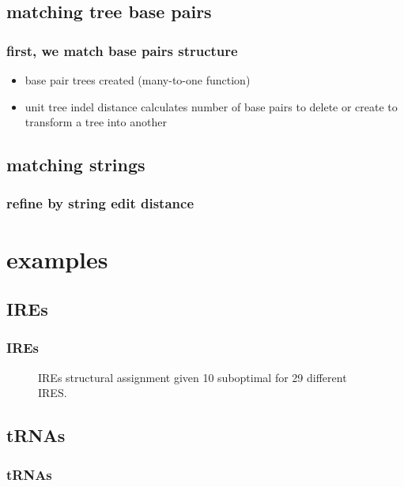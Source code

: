\documentclass{beamer}
\begin{document}
\subsection{matching tree base pairs}
\begin{frame}
	\frametitle{first, we match base pairs structure}
	\begin{figure}[!htb]
	\centering
	\resizebox{0.4\textwidth}{!}{}
	\end{figure} 
	
	\begin{itemize}
		\item base pair trees created (many-to-one function)
		\item unit tree indel distance calculates number of base pairs to delete or create to transform a tree into another
	\end{itemize}
	

\end{frame}



\subsection{matching strings}
\begin{frame}
	\frametitle{refine by string edit distance}

\end{frame}



\section{examples}
\subsection{IREs}
\begin{frame}
	\frametitle{IREs}
	\begin{figure}[!htb]
	\centering
	\resizebox{0.75\textwidth}{!}{}
	\caption{IREs structural assignment given 10 suboptimal for 29 different IRES.}
	\end{figure} 
\end{frame}



\subsection{tRNAs}
\begin{frame}
	\frametitle{tRNAs}
	

\end{frame}
\end{document}
